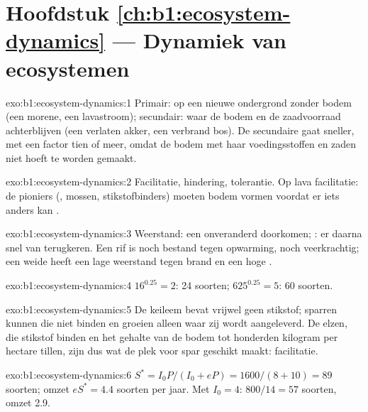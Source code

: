 \section*{Hoofdstuk \ref{ch:b1:ecosystem-dynamics} --- Dynamiek van ecosystemen}

\begin{solution}{exo:b1:ecosystem-dynamics:1}
Primair: op een nieuwe ondergrond zonder bodem (een morene, een lavastroom);
secundair: waar de bodem en de zaadvoorraad achterblijven (een verlaten
akker, een verbrand bos). De secundaire gaat sneller, met een factor tien of
meer, omdat de bodem met haar voedingsstoffen en zaden niet hoeft te worden
gemaakt.
\end{solution}

\begin{solution}{exo:b1:ecosystem-dynamics:2}
Facilitatie, hindering, tolerantie. Op lava facilitatie: de pioniers
(, mossen, stikstofbinders) moeten bodem vormen voordat er iets
anders kan .
\end{solution}

\begin{solution}{exo:b1:ecosystem-dynamics:3}
Weerstand: een  onveranderd doorkomen; : er daarna snel
van terugkeren. Een rif is noch bestand tegen opwarming, noch veerkrachtig;
een weide heeft een lage weerstand tegen brand en een hoge .
\end{solution}

\begin{solution}{exo:b1:ecosystem-dynamics:4}
$16^{0.25} = 2$: \num{24} soorten; $625^{0.25} = 5$: \num{60} soorten.
\end{solution}

\begin{solution}{exo:b1:ecosystem-dynamics:5}
De keileem bevat vrijwel geen stikstof; sparren kunnen die niet binden en
groeien alleen waar zij wordt aangeleverd. De elzen, die stikstof binden en
het gehalte van de bodem tot honderden kilogram per hectare tillen, zijn dus
wat de plek voor spar geschikt maakt: facilitatie.
\end{solution}

\begin{solution}{exo:b1:ecosystem-dynamics:6}
$S^* = I_0 P/(I_0 + eP) = 1600/(8 + 10) = 89$ soorten; omzet
$eS^* = 4.4$ soorten per jaar. Met $I_0 = 4$: $800/14 = 57$ soorten, omzet
\num{2.9}.
\end{solution}

